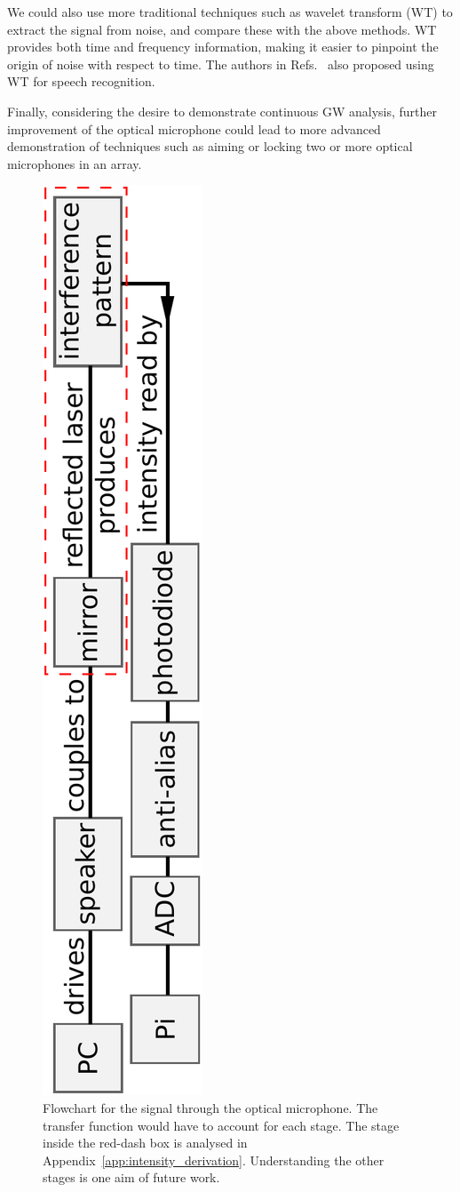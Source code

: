 \documentclass[paper-main.tex]{subfiles}
\begin{document}
We could also use more traditional techniques such as wavelet transform (WT) \citep{nason1995stationary} to extract the signal from noise, and compare these with the above methods. WT provides both time and frequency information, making it easier to pinpoint the origin of noise with respect to time. The authors in Refs.~\cite{tufekci2000feature,agbinya1996discrete} also proposed using WT for speech recognition. 


Finally, considering the desire to demonstrate continuous GW analysis, further improvement of the optical microphone could lead to more advanced demonstration of techniques such as aiming or locking two or more optical microphones in an array.


\begin{figure}
	\includegraphics[height=.99\textwidth, angle=-90]{figures/pipeline.pdf}
	\caption{
Flowchart for the signal through the optical microphone. The transfer function would have to account for each stage. 
The stage inside the red-dash box is analysed in Appendix~\ref{app:intensity_derivation}. Understanding the other stages is one aim of future work. 
}
	\label{fig:pipeline_highlighted}
\end{figure}

\end{document}
